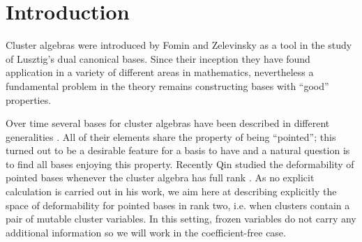 \documentclass{amsart}
\numberwithin{theorem}{section}
\newcommand{\cP}{\mathcal{P}}
\newcommand{\cS}{\mathcal{S}}
\begin{document}
\begin{figure}[h!]
\end{figure}
\vspace{-1em}
  \section{Introduction}
  Cluster algebras were introduced by Fomin and Zelevinsky as a tool in the study of Lusztig's dual canonical bases.
  Since their inception they have found application in a variety of different areas in mathematics, nevertheless a fundamental problem in the theory remains constructing bases with ``good'' properties. 
  
  Over time several bases for cluster algebras have been described in different generalities \cite{BZ14,CI12,DT13,Dup11,Dup12,GHKK18,LLZ14,MSW13,Pla13,SZ04,T14}.
  All of their elements share the property of being ``pointed''; this turned out to be a desirable feature for a basis to have and a natural question is to find all bases enjoying this property.
  Recently Qin studied the deformability of pointed bases whenever the cluster algebra has full rank \cite{Qin19}. 
  As no explicit calculation is carried out in his work, we aim here at describing explicitly the space of deformability for pointed bases in rank two, i.e. when clusters contain a pair of mutable cluster variables.
  In this setting, frozen variables do not carry any additional information so we will work in the coefficient-free case. 
\end{document}
